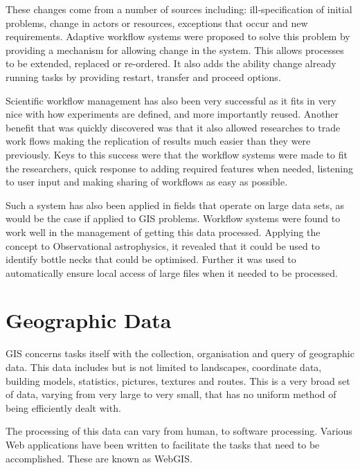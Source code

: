 \documentclass[11pt,twocolumn]{article}
\begin{document}
    These changes come from a number of sources including:
    ill-specification of initial problems, change in actors
    or resources, exceptions that occur and new requirements.
    Adaptive workflow systems were proposed to solve this
    problem by providing a mechanism for allowing change in
    the system. This allows processes to be extended,
    replaced or re-ordered. It also adds the ability change
    already running tasks by providing restart, transfer and
    proceed options\cite{vanderAalst2002125}.

    Scientific workflow management has also been very
    successful as it fits in very nice with how experiments
    are defined, and more importantly reused. Another
    benefit that was quickly discovered was that it also
    allowed researches to trade work flows making the
    replication of results much easier than they were
    previously. Keys to this success were that the workflow
    systems were made to fit the researchers, quick response
    to adding required features when needed, listening
    to user input and making sharing of workflows as easy as
    possible\cite{4721191}.

    Such a system has also been applied in fields that
    operate on large data sets, as would be the case if
    applied to GIS problems. Workflow systems were found
    to work well in the management of getting this data
    processed. Applying the concept to Observational
    astrophysics, it revealed that it could be used
    to identify bottle necks that could be optimised.
    Further it was used to automatically ensure local
    access of large files when it needed to be processed.
    \cite{Aragon:2009:WMH:1529282.1529491}

\section{Geographic Data}
    GIS concerns tasks itself with the collection, organisation
    and query of geographic data. This data includes but
    is not limited to landscapes, coordinate data, building models,
    statistics, pictures, textures and routes. This
    is a very broad set of data, varying from very large to very small,
    that has no uniform method  of being efficiently dealt with.

    The processing of this data can vary from human, to software
    processing. Various Web applications have been written
    to facilitate the tasks that need to be accomplished.
    These are known as WebGIS\cite{DiMartino:2007:TAG:1341012.1341081}.
\end{document}
